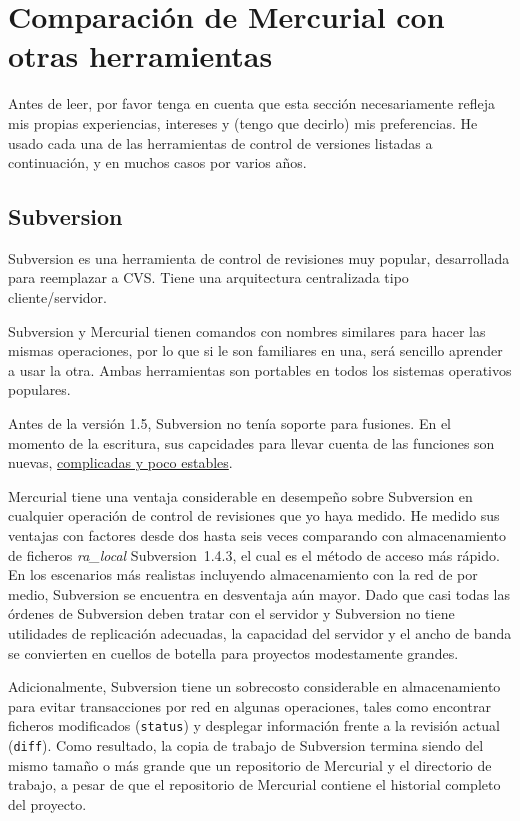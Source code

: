 \section{Comparación de Mercurial con otras herramientas}

Antes de leer, por favor tenga en cuenta que esta sección
necesariamente refleja mis propias experiencias, intereses y (tengo que
decirlo) mis preferencias. He usado cada una de las herramientas de
control de versiones listadas a continuación, y en muchos casos por
varios años.


\subsection{Subversion}

Subversion es una herramienta de control de revisiones muy popular,
desarrollada para reemplazar a CVS.  Tiene una arquitectura
centralizada tipo cliente/servidor.

Subversion y Mercurial tienen comandos con nombres similares para hacer
las mismas operaciones, por lo que si le son familiares en una, será
sencillo aprender a usar la otra. Ambas herramientas son portables en
todos los sistemas operativos populares.

Antes de la versión 1.5, Subversion no tenía soporte para fusiones. En
el momento de la escritura, sus capcidades para llevar cuenta de las
funciones son nuevas,
\href{http://svnbook.red-bean.com/nightly/en/svn.branchmerge.advanced.html#svn.branchmerge.advanced.finalword}{complicadas
  y poco estables}.

Mercurial tiene una ventaja considerable en desempeño sobre
Subversion en cualquier operación de control de revisiones que yo haya
medido. He medido sus ventajas con factores desde dos hasta seis veces
comparando con almacenamiento de ficheros \emph{ra\_local}
Subversion~1.4.3, el cual es el método de acceso más rápido.  En los
escenarios más realistas incluyendo almacenamiento con la red de por
medio, Subversion se encuentra en desventaja aún mayor. Dado que casi
todas las órdenes de Subversion deben tratar con el servidor y
Subversion no tiene utilidades de replicación adecuadas, la capacidad
del servidor y el ancho de banda se convierten en cuellos de botella
para proyectos modestamente grandes.

Adicionalmente, Subversion tiene un sobrecosto considerable en
almacenamiento para evitar transacciones por red en algunas
operaciones,
tales como encontrar ficheros modificados (\texttt{status}) y desplegar
información frente a la revisión actual (\texttt{diff}).  Como
resultado, la copia de trabajo de Subversion termina siendo del mismo
tamaño o más grande que un repositorio de Mercurial y el directorio de
trabajo, a pesar de que el repositorio de Mercurial contiene el
historial completo  del proyecto.

